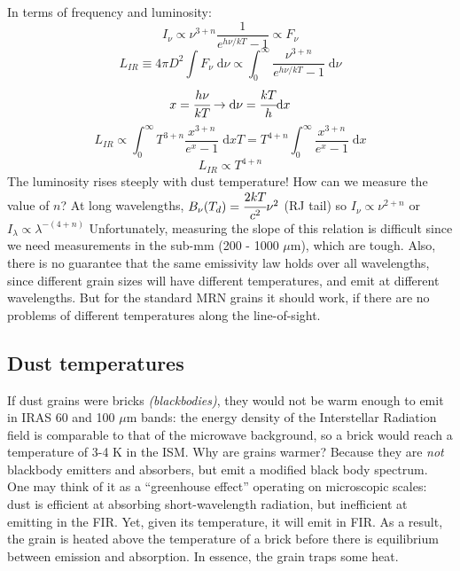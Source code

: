 \documentclass[12pt]{article}
\newcommand{\mar}[1]{\hspace{0pt}\marginpar{-\textcolor{black}{#1}-}}
\newcommand{\mynotes}[1]{{\fontfamily{cmss}\selectfont \textit{#1}}}
\begin{document}
In terms of frequency and luminosity:
\[
    I_{\nu} \propto \nu^{3+n} \frac{1}{ e^{h\nu/kT} - 1 }
    \propto F_{\nu}
    \]
\[
    L_{IR} \equiv 4{\pi}D^{2} \int{ F_{\nu}\; \mathrm{d}\nu }
    \propto \int_{0}^{\infty}{
        \frac{\nu^{3+n}}{ e^{h\nu/kT} - 1 }\; \mathrm{d}\nu }
    \]
\[
x = \cfrac{h\nu}{kT} \rightarrow \mathrm{d}\nu =
\cfrac{kT}{h} \mathrm{d}x
    \]
\[
    L_{IR}
    \propto \int_{0}^{\infty}{
        T^{3+n} \frac{x^{3+n}}{e^{x}-1}\; \mathrm{d}x T}
    = T^{4+n} \int_{0}^{\infty}{
        \frac{x^{3+n}}{e^{x}-1}\; \mathrm{d}x}
    \]
\[
    \boxed{ L_{IR} \propto T^{4+n} }
    \]
The luminosity rises steeply with dust temperature!
\mar{109}How can we measure the value of $n$?
At long wavelengths, $B_{\nu}(T_{d}) = \cfrac{2kT}{c^{2}} \nu^{2} $
(RJ tail) so $ I_{\nu} \propto \nu^{2+n} $ or
$ I_{\lambda} \propto \lambda^{-(4+n)} $
Unfortunately, measuring the slope of this relation is difficult since we need
measurements in the sub-mm (200 - 1000 $\mu$m), which are tough.
Also, there is no guarantee that the same emissivity law holds over all
wavelengths, since different grain sizes will have different temperatures,
and emit at different wavelengths. But for the standard MRN grains
it should work, if there are no problems of different temperatures
along the line-of-sight.

\newpage
\subsection{Dust temperatures}
If dust grains were bricks \mynotes{(blackbodies)}, they would not
be warm enough to emit in IRAS 60 and 100 $\mu$m bands: the energy
density of the Interstellar Radiation field is comparable to that
of the microwave background, so a brick would reach a temperature of
3-4 K in the ISM. Why are grains warmer? Because they are \emph{not}
blackbody emitters and absorbers, but emit a modified black body
spectrum. One may think of it as a ``greenhouse effect''
\mar{110}operating on microscopic scales: dust is efficient at absorbing
short-wavelength radiation, but inefficient at emitting in the FIR.
Yet, given its temperature, it will emit in FIR. As a result, the grain
is heated above the temperature of a brick before there is equilibrium
between emission and absorption. In essence, the grain traps some heat.
\end{document}
